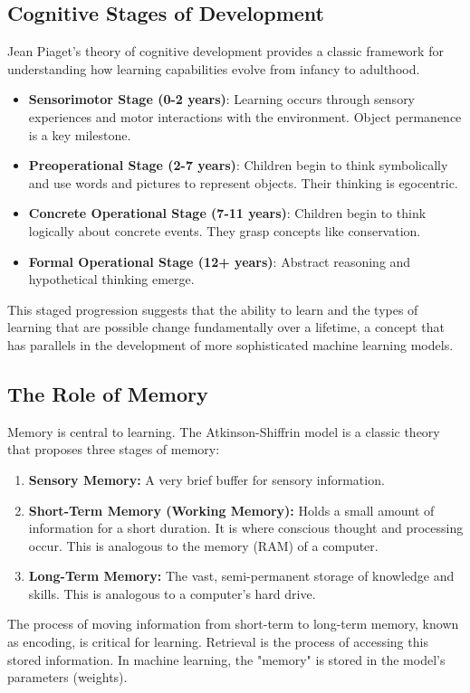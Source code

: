 \subsection{Cognitive Stages of Development}
Jean Piaget's theory of cognitive development provides a classic framework for understanding how learning capabilities evolve from infancy to adulthood.
\begin{itemize}
    \item \textbf{Sensorimotor Stage (0-2 years)}: Learning occurs through sensory experiences and motor interactions with the environment. Object permanence is a key milestone.
    \item \textbf{Preoperational Stage (2-7 years)}: Children begin to think symbolically and use words and pictures to represent objects. Their thinking is egocentric.
    \item \textbf{Concrete Operational Stage (7-11 years)}: Children begin to think logically about concrete events. They grasp concepts like conservation.
    \item \textbf{Formal Operational Stage (12+ years)}: Abstract reasoning and hypothetical thinking emerge.
\end{itemize}
This staged progression suggests that the ability to learn and the types of learning that are possible change fundamentally over a lifetime, a concept that has parallels in the development of more sophisticated machine learning models.

\subsection{The Role of Memory}
Memory is central to learning. The Atkinson-Shiffrin model is a classic theory that proposes three stages of memory:
\begin{enumerate}
    \item \textbf{Sensory Memory:} A very brief buffer for sensory information.
    \item \textbf{Short-Term Memory (Working Memory):} Holds a small amount of information for a short duration. It is where conscious thought and processing occur. This is analogous to the memory (RAM) of a computer.
    \item \textbf{Long-Term Memory:} The vast, semi-permanent storage of knowledge and skills. This is analogous to a computer's hard drive.
\end{enumerate}
The process of moving information from short-term to long-term memory, known as encoding, is critical for learning. Retrieval is the process of accessing this stored information. In machine learning, the "memory" is stored in the model's parameters (weights).

